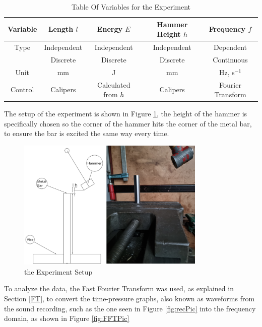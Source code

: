 \documentclass[a4paper,12pt]{article}
\begin{document}
    \begin{table}[H]%
    \begin{center}
    \begin{tabular}[H]{|c|c|c|c||c|}
    \hline
    Variable & Length $l$  & Energy $E$  & Hammer Height $h$ & Frequency $f$ \\
    \hline\hline
    Type     & Independent & Independent & Independent     & Dependent  \\
             & Discrete    & Discrete    & Discrete        & Continuous  \\
    \hline
    Unit     & mm          & J           & mm              & Hz, s$^{-1}$ \\
    \hline
    Control  & Calipers    & Calculated from $h$ & Calipers&  Fourier Transform\\
    \hline
    \end{tabular}
    \end{center}
    \caption{Table Of Variables for the Experiment}\label{Tab:ExpVarTable}
    \end{table}
    The setup of the experiment is shown in Figure \ref{fig:EXPPic}, the height of the hammer is specifically chosen so the corner of the hammer hits the corner of the metal bar, to ensure the bar is excited the same way every time.

    \begin{figure}[H]%
    \includegraphics[width=0.8\textwidth]{setup+diag}
    \centering
    \caption{the Experiment Setup}\label{fig:EXPPic}
    \end{figure}
    To analyze the data, the Fast Fourier Transform was used, as explained in Section \ref{FT}, to convert the time-pressure graphs, also known as waveforms from the sound recording, such as the one seen in Figure \ref{fig:recPic} into the frequency domain, as shown in Figure \ref{fig:FFTPic}
\end{document}
